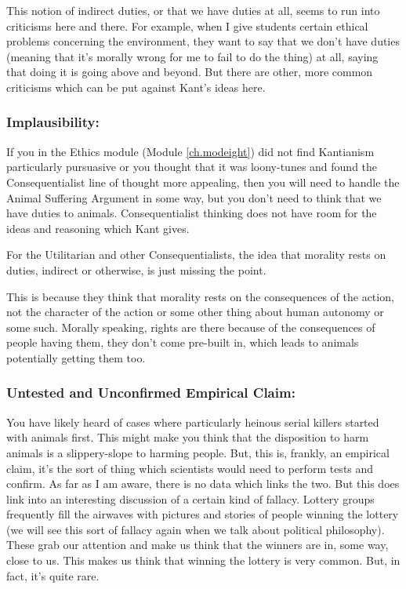This notion of indirect duties, or that we have duties at all, seems to run into criticisms here and there. For example, when I give students certain ethical problems concerning the environment, they want to say that we don't have duties (meaning that it's morally wrong for me to fail to do the thing) at all, saying that doing it is going above and beyond. But there are other, more common criticisms which can be put against Kant's ideas here. 
\subsubsection{Implausibility:}

If you in the Ethics module (Module \ref{ch.modeight}) did not find Kantianism particularly pursuasive or you thought that it was loony-tunes and found the Consequentialist line of thought more appealing, then you will need to handle the Animal Suffering Argument in some way, but you don't need to think that we have duties to animals. Consequentialist thinking does not have room for the ideas and reasoning which Kant gives.

For the Utilitarian and other Consequentialists, the idea that morality rests on duties, indirect or otherwise, is just missing the point. 

This is because they think that morality rests on the consequences of the action, not the character of the action or some other thing about human autonomy or some such. Morally speaking, rights are there because of the consequences of people having them, they don't come pre-built in, which leads to animals potentially getting them too. 
\subsubsection{Untested and Unconfirmed Empirical Claim:}

You have likely heard of cases where particularly heinous serial killers started with animals first. This might make you think that the disposition to harm animals is a slippery-slope to harming people. But, this is, frankly, an empirical claim, it's the sort of thing which scientists would need to perform tests and confirm. As far as I am aware, there is no data which links the two. But this does link into an interesting discussion of a certain kind of fallacy. Lottery groups frequently fill the airwaves with pictures and stories of people winning the lottery (we will see this sort of fallacy again when we talk about political philosophy). These grab our attention and make us think that the winners are in, some way, close to us. This makes us think that winning the lottery is very common. But, in fact, it's quite rare.

